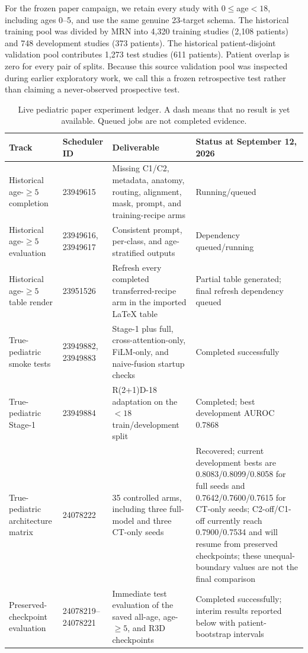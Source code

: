 \documentclass[10pt,twocolumn]{article}
\begin{document}
For the frozen paper campaign, we retain every study with $0\leq$age$<18$,
including ages 0--5, and use the same genuine 23-target schema. The historical
training pool was divided by MRN into 4,320 training studies (2,108 patients)
and 748 development studies (373 patients). The historical patient-disjoint
validation pool contributes 1,273 test studies (611 patients). Patient overlap
is zero for every pair of splits. Because this source validation pool was
inspected during earlier exploratory work, we call this a frozen retrospective
test rather than claiming a never-observed prospective test.

\begin{table}[t]
\centering
\caption{Live pediatric paper experiment ledger. A dash means that no result
is yet available. Queued jobs are not completed evidence.}
\label{tab:live-pediatric-ledger}
\begin{tabularx}{\textwidth}{@{}llXl@{}}
\toprule
Track & Scheduler ID & Deliverable & Status at September 12, 2026 \\
\midrule
Historical age-$\geq5$ completion & 23949615 & Missing C1/C2, metadata, anatomy, routing, alignment, mask, prompt, and training-recipe arms & Running/queued \\
Historical age-$\geq5$ evaluation & 23949616, 23949617 & Consistent prompt, per-class, and age-stratified outputs & Dependency queued/running \\
Historical age-$\geq5$ table render & 23951526 & Refresh every completed transferred-recipe arm in the imported \LaTeX{} table & Partial table generated; final refresh dependency queued \\
True-pediatric smoke tests & 23949882, 23949883 & Stage-1 plus full, cross-attention-only, FiLM-only, and naive-fusion startup checks & Completed successfully \\
True-pediatric Stage-1 & 23949884 & R(2+1)D-18 adaptation on the $<18$ train/development split & Completed; best development AUROC 0.7868 \\
True-pediatric architecture matrix & 24078222 & 35 controlled arms, including three full-model and three CT-only seeds & Recovered; current development bests are 0.8083/0.8099/0.8058 for full seeds and 0.7642/0.7600/0.7615 for CT-only seeds; C2-off/C1-off currently reach 0.7900/0.7534 and will resume from preserved checkpoints; these unequal-boundary values are not the final comparison \\
Preserved-checkpoint evaluation & 24078219--24078221 & Immediate test evaluation of the saved all-age, age-$\geq5$, and R3D checkpoints & Completed successfully; interim results reported below with patient-bootstrap intervals \\

\end{tabularx}
\end{table}
\end{document}
